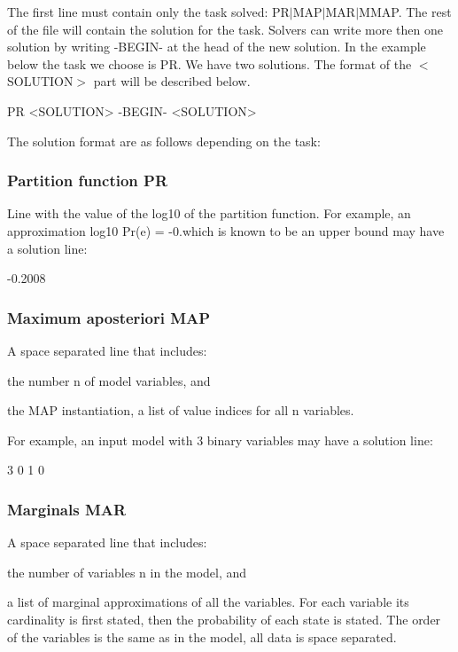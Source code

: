 The first line must contain only the task solved\+: {\ttfamily P\+R$\vert$\+M\+A\+P$\vert$\+M\+A\+R$\vert$\+M\+M\+AP}. The rest of the file will contain the solution for the task. Solvers can write more then one solution by writing {\ttfamily -\/\+B\+E\+G\+I\+N-\/} at the head of the new solution. In the example below the task we choose is {\ttfamily PR}. We have two solutions. The format of the {\ttfamily $<$S\+O\+L\+U\+T\+I\+ON$>$} part will be described below. \begin{DoxyVerb}    PR
    <SOLUTION>
    -BEGIN-
    <SOLUTION>
\end{DoxyVerb}


The solution format are as follows depending on the task\+:

\subsubsection*{Partition function {\ttfamily PR}}

Line with the value of the log10 of the partition function. For example, an approximation {\ttfamily log10 Pr(e) = -\/0.}which is known to be an upper bound may have a solution line\+: \begin{DoxyVerb}    -0.2008
\end{DoxyVerb}
 \subsubsection*{Maximum aposteriori {\ttfamily M\+AP}}

A space separated line that includes\+:
\begin{DoxyItemize}
\item the number {\ttfamily n} of model variables, and
\item the M\+AP instantiation, a list of value indices for all {\ttfamily n} variables.
\end{DoxyItemize}

For example, an input model with 3 binary variables may have a solution line\+: \begin{DoxyVerb}    3 0 1 0
\end{DoxyVerb}


\subsubsection*{Marginals {\ttfamily M\+AR}}

A space separated line that includes\+:
\begin{DoxyItemize}
\item the number of variables {\ttfamily n} in the model, and
\item a list of marginal approximations of all the variables. For each variable its cardinality is first stated, then the probability of each state is stated. The order of the variables is the same as in the model, all data is space separated.
\end{DoxyItemize}

